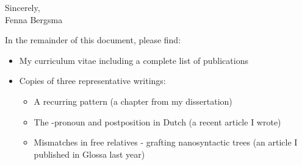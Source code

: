 \documentclass[12pt]{article}
\begin{document}
Sincerely,\\
Fenna Bergsma










\newpage

In the remainder of this document, please find:

\begin{itemize}
  \item My curriculum vitae including a complete list of publications
  \item Copies of three representative writings:
  \begin{itemize}
    \item A recurring pattern (a chapter from my dissertation)
    \item The -pronoun and postposition  in Dutch (a recent article I wrote)
    \item Mismatches in free relatives - grafting nanosyntactic trees (an article I published in Glossa last year)
  \end{itemize}
\end{itemize}
\end{document}

